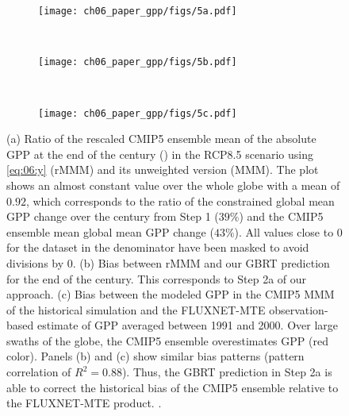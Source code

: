 \begin{figure}[!t]
  \centering
  \begin{subfigure}[b]{\SubfigureWidth{}}
    \texttt{[image: ch06\_paper\_gpp/figs/5a.pdf]}
    \caption{}
    \label{fig:06:step2a_results:a}
  \end{subfigure}
  \\
  \begin{subfigure}[b]{\SubfigureWidth{}}
    \texttt{[image: ch06\_paper\_gpp/figs/5b.pdf]}
    \caption{}
    \label{fig:06:step2a_results:b}
  \end{subfigure}
  ~
  \begin{subfigure}[b]{\SubfigureWidth{}}
    \texttt{[image: ch06\_paper\_gpp/figs/5c.pdf]}
    \caption{}
    \label{fig:06:step2a_results:c}
  \end{subfigure}
  \caption[
    Illustration of our \acl{ML} approach to constrain projected absolute
    \acf{GPP} at the end of the  century with observations in Step 2a.
  ]{
    (a) Ratio of the rescaled \acs{CMIP}5 ensemble mean of the absolute
    \acf{GPP} at the end of the  century () in the
    \acs{RCP}8.5 scenario using \cref{eq:06:y} (r\acs{MMM}) and its unweighted
    version (\acs{MMM}). The plot shows an almost constant value over the whole
    globe with a mean of $0.92$, which corresponds to the ratio of the
    constrained global mean \acs{GPP} change over the  century from
    Step 1 ($39 \unit{\%}$) and the \acs{CMIP}5 ensemble mean global mean
    \acs{GPP} change ($43 \unit{\%}$). All values close to $0$ for the dataset
    in the denominator have been masked to avoid divisions by $0$. (b) Bias
    between r\acs{MMM} and our \acf{GBRT} prediction for the end of the
     century. This corresponds to Step 2a of our approach. (c) Bias
    between the modeled \acs{GPP} in the \acs{CMIP}5 \acs{MMM} of the
    historical simulation and the FLUXNET-MTE observation-based estimate of
    \acs{GPP} \autocite{Jung2011} averaged between 1991 and 2000. Over large
    swaths of the globe, the \acs{CMIP}5 ensemble overestimates \acs{GPP} (red
    color). Panels (b) and (c) show similar bias patterns (pattern correlation
    of $R^2 = 0.88$). Thus, the \acs{GBRT} prediction in Step 2a is able to
    correct the historical bias of the \acs{CMIP}5 ensemble relative to the
    FLUXNET-MTE product. .
  }
  \label{fig:06:step2a_results}
\end{figure}

